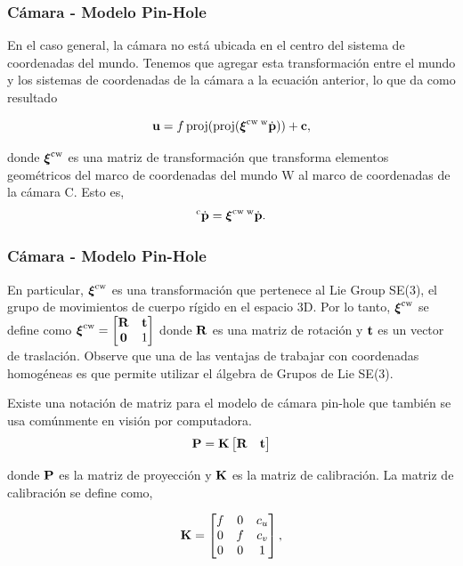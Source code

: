 \begin{frame}
	\frametitle{Cámara - Modelo Pin-Hole}
	
	\footnotesize
	
	En el caso general, la cámara no está ubicada en el centro del sistema de coordenadas del mundo. Tenemos que agregar esta transformación entre el mundo y los sistemas de coordenadas de la cámara a la ecuación anterior, lo que da como resultado
	
	\begin{equation*}
		\boldsymbol{\mathbf{u}}=f\operatorname{proj}(\operatorname{proj}(\boldsymbol{\mathbf{\xi}}^{\mathrm{c}\mathrm{w}}\prescript{\mathrm{\mathrm{w}}}{}{\dot{\boldsymbol{\mathbf{p}}}}))+\boldsymbol{\mathbf{c}},
	\end{equation*}
	
	donde $\boldsymbol{\mathbf{\xi}}^{\mathrm{c}\mathrm{w}}$ es una matriz de transformación que transforma elementos geométricos del marco de coordenadas del mundo $\mathrm{W}$ al marco de coordenadas de la cámara $\mathrm{C}$. Esto es,
	\begin{equation*}
		\prescript{\mathrm{\mathrm{c}}}{}{\dot{\boldsymbol{\mathbf{p}}}}=\boldsymbol{\mathbf{\xi}}^{\mathrm{c}\mathrm{w}}\prescript{\mathrm{\mathrm{w}}}{}{\dot{\boldsymbol{\mathbf{p}}}}.
	\end{equation*}
	
\end{frame}

\begin{frame}
	\frametitle{Cámara - Modelo Pin-Hole}
	
	\footnotesize
	
	En particular, $\boldsymbol{\mathbf{\xi}}^{\mathrm{c}\mathrm{w}}$ es una transformación que pertenece al Lie Group SE(3), el grupo de movimientos de cuerpo rígido en el espacio 3D. Por lo tanto, $\boldsymbol{\mathbf{\xi}}^{\mathrm{c}\mathrm{w}}$ se define como
	$\boldsymbol{\mathbf{\xi}}^{\mathrm{c}\mathrm{w}}=
	\begin{bmatrix}\boldsymbol{\mathbf{R}} & \boldsymbol{\mathbf{t}}\\
		\boldsymbol{\mathbf{0}} & 1
	\end{bmatrix}$ donde $\boldsymbol{\mathbf{R}}$ es una matriz de rotación y $\boldsymbol{\mathbf{t}}$ es un vector de traslación. Observe que una de las ventajas de trabajar con coordenadas homogéneas es que permite utilizar el álgebra de Grupos de Lie SE(3).
	
	Existe una notación de matriz para el modelo de cámara pin-hole que también se usa comúnmente en visión por computadora.
	\begin{equation*}
		\boldsymbol{\mathbf{P}}=\boldsymbol{\mathbf{K}}\begin{bmatrix}\boldsymbol{\mathbf{R}} & \boldsymbol{\mathbf{t}}\end{bmatrix}
	\end{equation*}
	
	donde $\boldsymbol{\mathbf{P}}$ es la matriz de proyección y $\boldsymbol{\mathbf{K}}$ es la matriz de calibración. La matriz de calibración se define como,
	
	\begin{equation*}
		\boldsymbol{\mathbf{K}}=
		\begin{bmatrix}f & 0 & c_{u}\\
			0 & f & c_{v}\\
			0 & 0 & 1
		\end{bmatrix},
	\end{equation*}
	
\end{frame}

